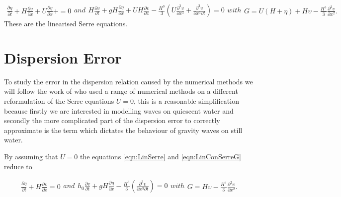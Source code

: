 \begin{subequations}
	\begin{gather}
		\label{eqn:LinCont}
		\frac{\partial  \eta}{\partial  t} + H\frac{\partial  \upsilon}{\partial  x} + U\frac{\partial  \eta}{\partial  x} +  = 0
	\end{gather}
	and
	\begin{gather}
	\label{eqn:LineMome}
	H\frac{\partial  \upsilon}{\partial  t} + gH\frac{\partial  \eta}{\partial  x} + UH\frac{\partial  \upsilon}{\partial  x} - \frac{H^3}{3}\left(U\frac{\partial^3  \upsilon}{\partial  x^3} + \frac{\partial^3  \upsilon}{\partial  x^3 \partial  t}  \right)  = 0
	\end{gather}
\label{eqn:LinSerre}	
with
\begin{gather}
	G = U\left(H + \eta\right) + H\upsilon -\frac{H^3}{3} \frac{\partial^2 \upsilon}{\partial x^2}.
	\label{eqn:LinConSerreG}
\end{gather}	
\end{subequations}
These are the linearised Serre equations.

\section{Dispersion Error}
To study the error in the dispersion relation caused by the numerical methods we will follow the work of \cite{Filippini-etal-2016-381} who used a range of numerical methods on a different reformulation of the Serre equations $U = 0$, this is a reasonable simplification because firstly we are interested in modelling waves on quiescent water and secondly the more complicated part of the dispersion error to correctly approximate is the term which dictates the behaviour of gravity waves on still water.

By assuming that $U= 0$ the equations \eqref{eqn:LinSerre} and \eqref{eqn:LinConSerreG} reduce to

\begin{subequations}
	\label{eqn:LinSerreu0}
	\begin{gather}
	\label{eqn:LinContu0}
	\frac{\partial  \eta}{\partial  t} + H\frac{\partial  \upsilon}{\partial  x} = 0
	\end{gather}
	and
	\begin{gather}
	\label{eqn:LineMomeu0}
	h_0\frac{\partial  \upsilon}{\partial  t} + g H \frac{\partial  \eta}{\partial  x} - \frac{H^3}{3}\left(\frac{\partial^3  \upsilon}{\partial  x^3 \partial  t}  \right)  = 0
	\end{gather}	
with
	\begin{gather}
	G = H\upsilon -\frac{H^3}{3} \frac{\partial^2 \upsilon}{\partial x^2}.
	\label{eqn:LinConSerreGu0}
	\end{gather}	
\end{subequations}

